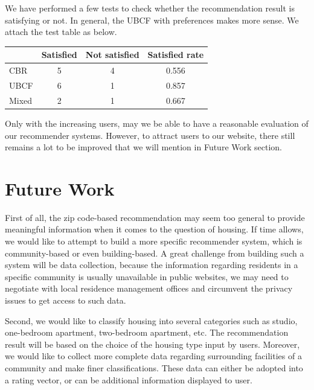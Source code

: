 \documentclass[letterpaper,twocolumn,10pt]{article}
\begin{document}
We have performed a few tests to check whether the recommendation result is satisfying or not.   In general, the UBCF with preferences makes more sense.  We attach  the test table  as below. 

\begin{tabular}{ | l | c | c | c |  }
\hline
 & Satisfied & Not satisfied & Satisfied rate \\
 \hline
 CBR & 5& 4 & 0.556 \\
  \hline
UBCF & 6 &1 & 0.857  \\
  \hline
 Mixed & 2& 1& 0.667 \\
 \hline
\end{tabular}

Only with the increasing users, may  we be able to have a reasonable evaluation of our recommender systems. However, to attract users to our website, there still remains a lot to be improved that we will mention in Future Work section.


\section{Future Work}
First of all, the zip code-based recommendation may seem  too general to provide meaningful information when it comes to the question of housing. If time allows, we would like to attempt to build a more specific recommender system, which is community-based or even building-based. A great challenge from building such a system will be data collection, because the information regarding residents in a specific community is usually unavailable in public websites, we may need to negotiate with local residence management offices  and circumvent the privacy issues  to get access to such data. 

Second, we would like to classify housing  into several categories such as studio, one-bedroom apartment, two-bedroom apartment, etc. The recommendation result will be based on the choice of the housing type input  by users.  Moreover, we would like to collect more complete data regarding surrounding facilities of a community and make finer classifications. These data can either be adopted into a rating vector, or can be additional information displayed to user.
\end{document}
